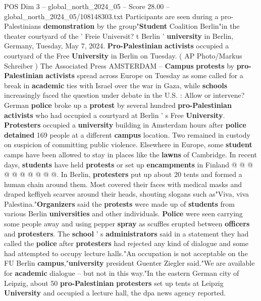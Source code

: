 \begin{textsample}{POS Dim 3 – global\_north\_2024\_05 – Score 28.00 – global\_north\_2024\_05/108148303.txt}  \label{ex:f3_pos_008}
Participants are seen during a pro-Palestinians \textbf{demonstration} by the group"\textbf{Student} Coalition Berlin"in the theater courtyard of the ' Freie Universit? t Berlin ' \textbf{university} in Berlin, Germany, Tuesday, May 7, 2024. \textbf{Pro-Palestinian} \textbf{activists} occupied a courtyard of the Free \textbf{University} in Berlin on Tuesday. ( AP Photo/Markus Schreiber ) The Associated Press AMSTERDAM -- \textbf{Campus} \textbf{protests} by \textbf{pro-Palestinian} \textbf{activists} spread across Europe on Tuesday as some called for a break in \textbf{academic} ties with Israel over the war in Gaza, while \textbf{schools} increasingly faced the question under debate in the U.S. : Allow or intervene?
German \textbf{police} broke up a \textbf{protest} by several hundred \textbf{pro-Palestinian} \textbf{activists} who had occupied a courtyard at Berlin ' s Free \textbf{University}. \textbf{Protesters} occupied a \textbf{university} building in Amsterdam hours after \textbf{police} \textbf{detained} 169 people at a different \textbf{campus} location.
Two remained in custody on suspicion of committing public violence.
Elsewhere in Europe, some \textbf{student} camps have been allowed to stay in places like the \textbf{lawns} of Cambridge.
In recent days, \textbf{students} have held \textbf{protests} or set up \textbf{encampments} in Finland @ @ @ @ @ @ @ @ @ @.
In Berlin, \textbf{protesters} put up about 20 tents and formed a human chain around them.
Most covered their faces with medical masks and draped keffiyeh scarves around their heads, shouting slogans such as"Viva, viva Palestina."\textbf{Organizers} said the \textbf{protests} were made up of \textbf{students} from various Berlin \textbf{universities} and other individuals. \textbf{Police} were seen carrying some people away and using pepper \textbf{spray} as scuffles erupted between \textbf{officers} and \textbf{protesters}.
The \textbf{school} ' s \textbf{administrators} said in a statement they had called the \textbf{police} after \textbf{protesters} had rejected any kind of dialogue and some had attempted to occupy lecture halls."An occupation is not acceptable on the FU Berlin \textbf{campus},"\textbf{university} president Guenter Ziegler said."We are available for \textbf{academic} dialogue -- but not in this way."In the eastern German city of Leipzig, about 50 \textbf{pro-Palestinian} \textbf{protesters} set up tents at Leipzig \textbf{University} and occupied a lecture hall, the dpa news agency reported.

\end{textsample}
